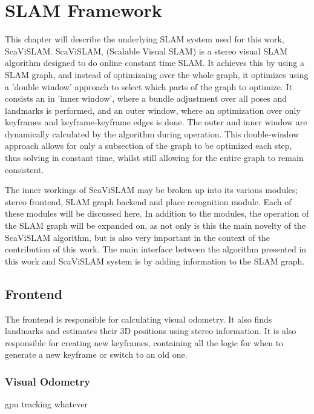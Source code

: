 \chapter{SLAM Framework}
\label{chapter:ScaViSLAM}

This chapter will describe the underlying SLAM system used for this work, ScaViSLAM.  ScaViSLAM,
(Scalable Visual SLAM) is a stereo visual SLAM algorithm designed to do online constant time SLAM. 
It achieves this by using a SLAM graph, and instead of optimizaing over the whole graph,
it optimizes using a 'double window' approach to select which parts of the graph to optimize.  It
consists an in 'inner window', where a bundle adjustment over all poses and landmarks is performed,
and an outer window, where an optimization over only keyframes and keyframe-keyframe edges is done.
 The outer and inner window are dynamically calculated by the algorithm during operation.  This
double-window approach allows for only a subsection of the graph to be optimized each step,
thus solving in constant time, whilst still allowing for the entire graph to remain consistent.

The inner workings of ScaViSLAM may be broken up into its various modules; stereo frontend, SLAM
graph backend and place recognition module.  Each of these modules will be discussed here.  In
addition to the modules, the operation of the SLAM graph will be expanded on, as not only is this
the main novelty of the ScaViSLAM algorithm, but is also very important in the context of the
contribution of this work. The main interface between the algorithm presented in this work and
ScaViSLAM system is by adding information to the SLAM graph.

\section{Frontend}
\label{sec:scavislam_frontend}

The frontend is responsible for calculating visual odometry.  It also finds landmarks and estimates
their 3D positions using stereo information.  It is also responsible for creating new keyframes,
containing all the logic for when to generate a new keyframe or switch to an old one. 

\subsection{Visual Odometry}

gpu tracking whatever


